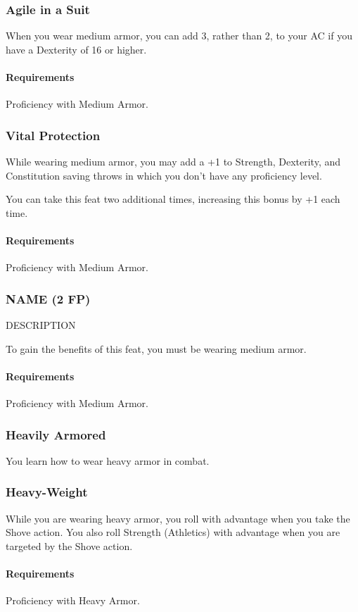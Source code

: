 \subsubsection{Agile in a Suit} \label{feat::agileinasuit}
    When you wear medium armor, you can add 3, rather than 2, to your AC if you have a Dexterity of 16 or higher.
    \paragraph{Requirements} Proficiency with Medium Armor.
\subsubsection{Vital Protection} \label{feat::vitalprotection}
    While wearing medium armor, you may add a +1 to Strength, Dexterity, and Constitution saving throws in which you don't have any proficiency level.

    You can take this feat two additional times, increasing this bonus by +1 each time.
    \paragraph{Requirements} Proficiency with Medium Armor.
\subsubsection{NAME (2 FP)} \label{feat::name}
    DESCRIPTION

    To gain the benefits of this feat, you must be wearing medium armor.
    \paragraph{Requirements} Proficiency with Medium Armor.
\subsubsection{Heavily Armored} \label{feat::heavilyarmored}
    You learn how to wear heavy armor in combat.
\subsubsection{Heavy-Weight} \label{feat::heavyweight}
    While you are wearing heavy armor, you roll with advantage when you take the Shove action.
    You also roll Strength (Athletics) with advantage when you are targeted by the Shove action.
    \paragraph{Requirements} Proficiency with Heavy Armor.
